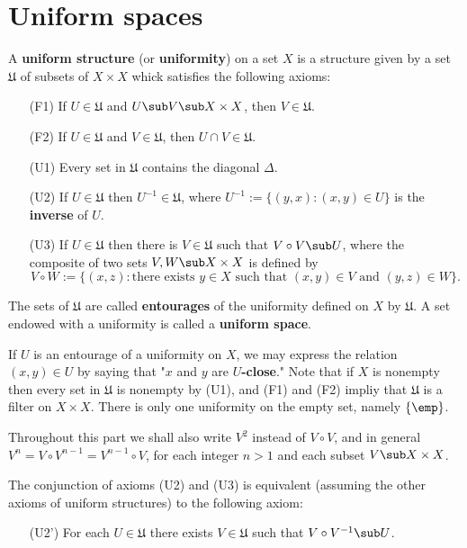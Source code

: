 \section{Uniform spaces}
\begin{definition}
A \textbf{uniform structure} (or \textbf{uniformity}) on a set $X$ is a structure given by a set $\mathfrak{U}$ of subsets of $X\times X$ whick satisfies the following axioms:
\begin{itemize}
\item[(F1)] If $U\in\mathfrak{U}$ and $U\sub V\sub X\times X$, then $V\in\mathfrak{U}$.
\item[(F2)] If $U\in\mathfrak{U}$ and $V\in\mathfrak{U}$, then $U\cap V\in\mathfrak{U}$.
\item[(U1)] Every set in $\mathfrak{U}$ contains the diagonal $\Delta$.
\item[(U2)] If $U\in\mathfrak{U}$ then $U^{-1}\in\mathfrak{U}$, where $U^{-1}:=\{(y,x):(x,y)\in U\}$ is the \textbf{inverse} of $U$. 
\item[(U3)] If $U\in\mathfrak{U}$ then there is $V\in\mathfrak{U}$ such that $V\circ V\sub U$, where the composite of two sets $V,W\sub X\times X$ is defined by
\[V\circ W:=\{(x,z):\text{there exists $y\in X$ such that $(x,y)\in V$ and $(y,z)\in W$}\}.\]
\end{itemize}
The sets of $\mathfrak{U}$ are called \textbf{entourages} of the uniformity defined on $X$ by $\mathfrak{U}$. A set endowed with a uniformity is called a \textbf{uniform space}.
\end{definition}
If $U$ is an entourage of a uniformity on $X$, we may express the relation $(x,y)\in U$ by saying that "$x$ and $y$ are \textbf{$U$-close}." Note that if $X$ is nonempty then every set in $\mathfrak{U}$ is nonempty by (U1), and (F1) and (F2) impliy that $\mathfrak{U}$ is a filter on $X\times X$. There is only one uniformity on the empty set, namely $\{\emp\}$.\par
Throughout this part we shall also write $V^2$ instead of $V\circ V$, and in general $V^n=V\circ V^{n-1}=V^{n-1}\circ V$, for each integer $n>1$ and each subset $V\sub X\times X$. 
\begin{lemma}\label{uniformity equivalent axiom}
The conjunction of axioms (U2) and (U3) is equivalent (assuming the other axioms of uniform structures) to the following axiom:
\begin{itemize}
\item[(U2')] For each $U\in\mathfrak{U}$ there exists $V\in\mathfrak{U}$ such that $V\circ V^{-1}\sub U$.
\end{itemize}
\end{lemma}

